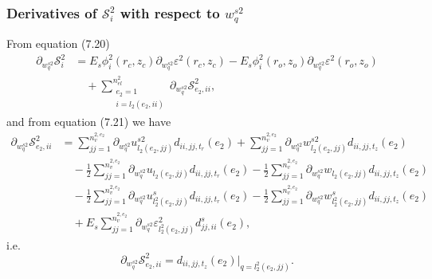 \documentclass{article}
\begin{document}
\subsubsection{Derivatives of $\mathcal{S}_i^2$ with respect to $w_q^{s2}$} %
From equation (7.20)
\begin{align}
\partial_{w_q^{s2}} \mathcal{S}_i^2 &= E_s \phi_i^2(r_c,z_c) \partial_{w_q^{s2}} \varepsilon^2(r_c,z_c) - E_s \phi_i^2(r_o,z_o) \partial_{w_q^{s2}} \varepsilon^2(r_o,z_o) \nonumber\\
&\quad + \sum_{\substack{e_2=1\\ i=l_2(e_2,ii)}}^{n_{el}^2} \partial_{w_q^{s2}} \mathcal{S}_{e_2,ii}^2, \tag{7.33}
\end{align}
and from equation (7.21) we have
\begin{align}
\partial_{w_q^{s2}} \mathcal{S}_{e_2,ii}^2 &= \sum_{jj=1}^{n_v^{2,e_2}} \partial_{w_q^{s2}} u_{l_2(e_2,jj)}^{s2} d_{ii,jj,t_r}(e_2) + \sum_{jj=1}^{n_v^{2,e_2}} \partial_{w_q^{s2}} w_{l_2(e_2,jj)}^{s2} d_{ii,jj,t_z}(e_2) \nonumber\\
&\quad - \frac{1}{2} \sum_{jj=1}^{n_v^{2,e_2}} \partial_{w_q^{s2}} u_{l_2(e_2,jj)} d_{ii,jj,t_r}(e_2) - \frac{1}{2} \sum_{jj=1}^{n_v^{2,e_2}} \partial_{w_q^{s2}} w_{l_2(e_2,jj)} d_{ii,jj,t_z}(e_2) \nonumber\\
&\quad - \frac{1}{2} \sum_{jj=1}^{n_v^{2,e_2}} \partial_{w_q^{s2}} u_{l_2^2(e_2,jj)}^s d_{ii,jj,t_r}(e_2) - \frac{1}{2} \sum_{jj=1}^{n_v^{2,e_2}} \partial_{w_q^{s2}} w_{l_2^2(e_2,jj)}^s d_{ii,jj,t_z}(e_2) \nonumber\\
&\quad + E_s \sum_{jj=1}^{n_v^{2,e_2}} \partial_{w_q^{s2}} \varepsilon_{l_2^2(e_2,jj)}^2 d_{jj,ii}^s(e_2), \tag{7.34}
\end{align}
i.e.
\begin{equation}
\partial_{w_q^{s2}} \mathcal{S}_{e_2,ii}^2 = d_{ii,jj,t_z}(e_2) \big|_{q=l_2^2(e_2,jj)}. \tag{7.35}
\end{equation}
\end{document}
